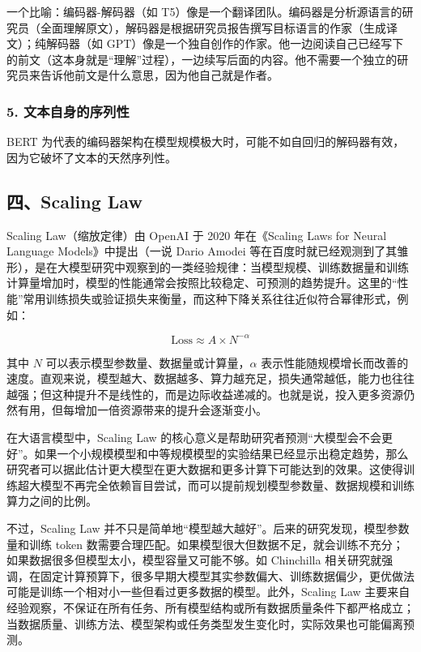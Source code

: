 一个比喻：编码器-解码器（如 T5）像是一个翻译团队。编码器是分析源语言的研究员（全面理解原文），解码器是根据研究员报告撰写目标语言的作家（生成译文）；纯解码器（如 GPT）像是一个独自创作的作家。他一边阅读自己已经写下的前文（这本身就是``理解''过程），一边续写后面的内容。他不需要一个独立的研究员来告诉他前文是什么意思，因为他自己就是作者。

\hypertarget{ux6587ux672cux81eaux8eabux7684ux5e8fux5217ux6027}{%
\subsubsection{5. 文本自身的序列性}\label{ux6587ux672cux81eaux8eabux7684ux5e8fux5217ux6027}}

BERT 为代表的编码器架构在模型规模极大时，可能不如自回归的解码器有效，因为它破坏了文本的天然序列性。

\hypertarget{ux56dbscaling-law}{%
\subsection{四、Scaling Law}\label{ux56dbscaling-law}}

Scaling Law（缩放定律）由 OpenAI 于 2020 年在《Scaling Laws for Neural Language Models》中提出（一说 Dario Amodei 等在百度时就已经观测到了其雏形），是在大模型研究中观察到的一类经验规律：当模型规模、训练数据量和训练计算量增加时，模型的性能通常会按照比较稳定、可预测的趋势提升。这里的``性能''常用训练损失或验证损失来衡量，而这种下降关系往往近似符合幂律形式，例如：

\[
\mathrm{Loss} \approx A \times N^{-\alpha}
\]

其中 \(N\) 可以表示模型参数量、数据量或计算量，\(\alpha\) 表示性能随规模增长而改善的速度。直观来说，模型越大、数据越多、算力越充足，损失通常越低，能力也往往越强；但这种提升不是线性的，而是边际收益递减的。也就是说，投入更多资源仍然有用，但每增加一倍资源带来的提升会逐渐变小。

在大语言模型中，Scaling Law 的核心意义是帮助研究者预测``大模型会不会更好''。如果一个小规模模型和中等规模模型的实验结果已经显示出稳定趋势，那么研究者可以据此估计更大模型在更大数据和更多计算下可能达到的效果。这使得训练超大模型不再完全依赖盲目尝试，而可以提前规划模型参数量、数据规模和训练算力之间的比例。

不过，Scaling Law 并不只是简单地``模型越大越好''。后来的研究发现，模型参数量和训练 token 数需要合理匹配。如果模型很大但数据不足，就会训练不充分；如果数据很多但模型太小，模型容量又可能不够。如 Chinchilla 相关研究就强调，在固定计算预算下，很多早期大模型其实参数偏大、训练数据偏少，更优做法可能是训练一个相对小一些但看过更多数据的模型。此外，Scaling Law 主要来自经验观察，不保证在所有任务、所有模型结构或所有数据质量条件下都严格成立；当数据质量、训练方法、模型架构或任务类型发生变化时，实际效果也可能偏离预测。

